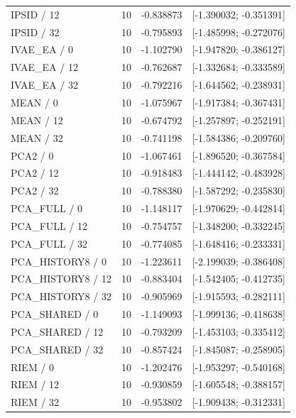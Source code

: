 \begin{longtable}{p{.56\linewidth}rrr}
IPSID / 12 & 10 & -0.838873 & [-1.390032; -0.351391] \\
IPSID / 32 & 10 & -0.795893 & [-1.485998; -0.272076] \\
IVAE\_EA / 0 & 10 & -1.102790 & [-1.947820; -0.386127] \\
IVAE\_EA / 12 & 10 & -0.762687 & [-1.332684; -0.333589] \\
IVAE\_EA / 32 & 10 & -0.792216 & [-1.644562; -0.238931] \\
MEAN / 0 & 10 & -1.075967 & [-1.917384; -0.367431] \\
MEAN / 12 & 10 & -0.674792 & [-1.257897; -0.252191] \\
MEAN / 32 & 10 & -0.741198 & [-1.584386; -0.209760] \\
PCA2 / 0 & 10 & -1.067461 & [-1.896520; -0.367584] \\
PCA2 / 12 & 10 & -0.918483 & [-1.444142; -0.483928] \\
PCA2 / 32 & 10 & -0.788380 & [-1.587292; -0.235830] \\
PCA\_FULL / 0 & 10 & -1.148117 & [-1.970629; -0.442814] \\
PCA\_FULL / 12 & 10 & -0.754757 & [-1.348200; -0.332245] \\
PCA\_FULL / 32 & 10 & -0.774085 & [-1.648416; -0.233331] \\
PCA\_HISTORY8 / 0 & 10 & -1.223611 & [-2.199039; -0.386408] \\
PCA\_HISTORY8 / 12 & 10 & -0.883404 & [-1.542405; -0.412735] \\
PCA\_HISTORY8 / 32 & 10 & -0.905969 & [-1.915593; -0.282111] \\
PCA\_SHARED / 0 & 10 & -1.149093 & [-1.999136; -0.418638] \\
PCA\_SHARED / 12 & 10 & -0.793209 & [-1.453103; -0.335412] \\
PCA\_SHARED / 32 & 10 & -0.857424 & [-1.845087; -0.258905] \\
RIEM / 0 & 10 & -1.202476 & [-1.953297; -0.540168] \\
RIEM / 12 & 10 & -0.930859 & [-1.605548; -0.388157] \\
RIEM / 32 & 10 & -0.953802 & [-1.909438; -0.312331] \\
\bottomrule\end{longtable}
